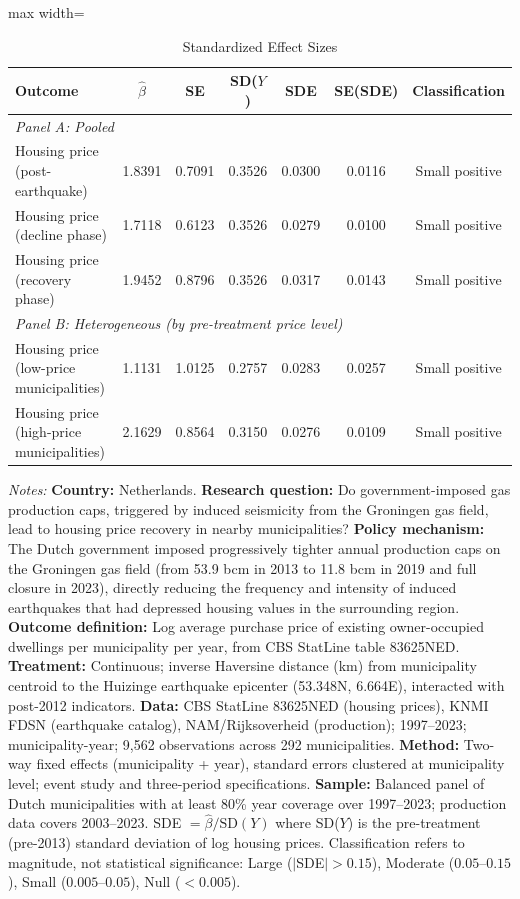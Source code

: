 \begin{table}[htbp]
\centering
\begin{threeparttable}
\caption{Standardized Effect Sizes}
\label{tab:sde}
\begin{adjustbox}{max width=\textwidth}
\begin{tabular}{lcccccc}
\toprule
Outcome & $\hat{\beta}$ & SE & SD($Y$) & SDE & SE(SDE) & Classification \\
\midrule
\multicolumn{7}{l}{\textit{Panel A: Pooled}} \\
Housing price (post-earthquake) & 1.8391 & 0.7091 & 0.3526 & 0.0300 & 0.0116 & Small positive \\
Housing price (decline phase) & 1.7118 & 0.6123 & 0.3526 & 0.0279 & 0.0100 & Small positive \\
Housing price (recovery phase) & 1.9452 & 0.8796 & 0.3526 & 0.0317 & 0.0143 & Small positive \\
\midrule
\multicolumn{7}{l}{\textit{Panel B: Heterogeneous (by pre-treatment price level)}} \\
Housing price (low-price municipalities) & 1.1131 & 1.0125 & 0.2757 & 0.0283 & 0.0257 & Small positive \\
Housing price (high-price municipalities) & 2.1629 & 0.8564 & 0.3150 & 0.0276 & 0.0109 & Small positive \\
\bottomrule
\end{tabular}
\end{adjustbox}
\begin{tablenotes}[flushleft]
\small
\item \textit{Notes:} \textbf{Country:} Netherlands. \textbf{Research question:} Do government-imposed gas production caps, triggered by induced seismicity from the Groningen gas field, lead to housing price recovery in nearby municipalities? \textbf{Policy mechanism:} The Dutch government imposed progressively tighter annual production caps on the Groningen gas field (from 53.9 bcm in 2013 to 11.8 bcm in 2019 and full closure in 2023), directly reducing the frequency and intensity of induced earthquakes that had depressed housing values in the surrounding region. \textbf{Outcome definition:} Log average purchase price of existing owner-occupied dwellings per municipality per year, from CBS StatLine table 83625NED. \textbf{Treatment:} Continuous; inverse Haversine distance (km) from municipality centroid to the Huizinge earthquake epicenter (53.348\textdegree N, 6.664\textdegree E), interacted with post-2012 indicators. \textbf{Data:} CBS StatLine 83625NED (housing prices), KNMI FDSN (earthquake catalog), NAM/Rijksoverheid (production); 1997--2023; municipality-year; 9,562 observations across 292 municipalities. \textbf{Method:} Two-way fixed effects (municipality + year), standard errors clustered at municipality level; event study and three-period specifications. \textbf{Sample:} Balanced panel of Dutch municipalities with at least 80\% year coverage over 1997--2023; production data covers 2003--2023. SDE $= \hat{\beta} / \text{SD}(Y)$ where SD($Y$) is the pre-treatment (pre-2013) standard deviation of log housing prices. Classification refers to magnitude, not statistical significance: Large ($|$SDE$| > 0.15$), Moderate ($0.05$--$0.15$), Small ($0.005$--$0.05$), Null ($< 0.005$).

\end{tablenotes}
\end{threeparttable}
\end{table}
